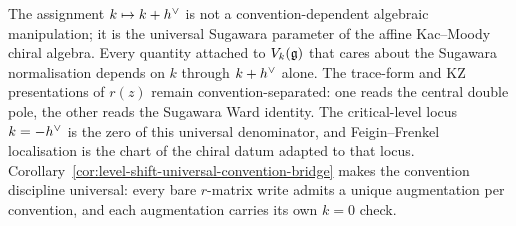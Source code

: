The assignment $k \mapsto k+h^{\vee}$ is not a convention-dependent
algebraic manipulation; it is the universal Sugawara parameter of
the affine Kac--Moody chiral algebra. Every quantity attached to
$V_k(\mathfrak{g})$ that cares about the Sugawara normalisation depends on
$k$ through $k+h^{\vee}$ alone. The trace-form and KZ presentations of
$r(z)$ remain convention-separated: one reads the central double
pole, the other reads the Sugawara Ward identity. The
critical-level locus $k = -h^{\vee}$ is the zero of this universal
denominator, and Feigin--Frenkel localisation is the chart of the
chiral datum adapted to that locus.
Corollary~\ref{cor:level-shift-universal-convention-bridge}
makes the convention discipline universal: every bare $r$-matrix
write admits a unique augmentation per convention, and each
augmentation carries its own $k=0$ check.
